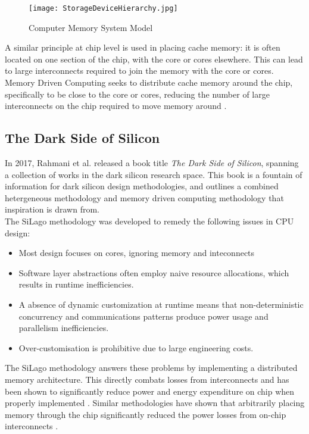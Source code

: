 			\begin{figure}
				\centering
				\texttt{[image: StorageDeviceHierarchy.jpg]}
				\caption{Computer Memory System Model \cite{CPUScheduling}}
				\label{StorageDeviceHierarchy}
			\end{figure}
		
			A similar principle at chip level is used in placing cache memory: it is often located on one section of the chip, with the core or cores elsewhere. This can lead to large interconnects required to join the memory with the core or cores. Memory Driven Computing seeks to distribute cache memory around the chip, specifically to be close to the core or cores, reducing the number of large interconnects on the chip required to move memory around \cite{EndOfMooresLawWilliams}. 
		
		\subsection{The Dark Side of Silicon}
			In 2017, Rahmani et al. released a book title \textit{The Dark Side of Silicon}, spanning a collection of works in the dark silicon research space. This book is a fountain of information for dark silicon design methodologies, and outlines a combined hetergeneous methodology and memory driven computing methodology that inspiration is drawn from.\\
			The SiLago methodology was developed to remedy the following issues in CPU design:
			\begin{itemize}
				\item Most design focuses on cores, ignoring memory and inteconnects
				\item Software layer abstractions often employ naive resource allocations, which results in runtime inefficiencies.
				\item A absence of dynamic customization at runtime means that non-deterministic concurrency and communications patterns produce power usage and parallelism inefficiencies.
				\item Over-customisation is prohibitive due to large engineering costs.
			\end{itemize}
			The SiLago methodology answers these problems by implementing a distributed memory architecture. This directly combats losses from interconnects and has been shown to significantly reduce power and energy expenditure on chip when properly implemented \cite{SiLagoSolution}. Similar methodologies have shown that arbitrarily placing memory through the chip significantly reduced the power losses from on-chip interconnects \cite{DynamicDirectories}.
	
